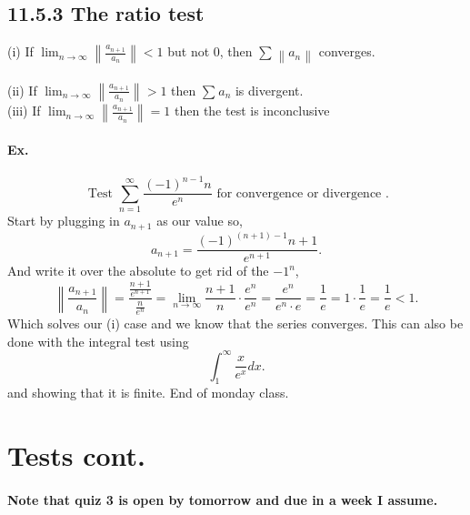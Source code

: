 \subsection*{11.5.3 The ratio test}%
\label{sub:11.5.3 The ratio test}
(i) If $ \lim_{ n \to \infty} \left\| \frac{ a_{ n+1 } }{ a_n } \right\|<1 $ but not 0, then $ \sum_{  } ^{  } \left\| a_n \right\| $ converges. \\ \\
(ii) If $ \lim_{ n \to \infty} \left\| \frac{ a_{ n+1 } }{ a_n } \right\| >1 $ then $ \sum_{  } ^{  } a_n $ is divergent. \\
(iii) If $ \lim_{ n \to \infty} \left\| \frac{ a_{ n+1 } }{ a_n } \right\|=1 $ then the test is inconclusive
\paragraph{Ex.}
\[
\text{ Test }\sum_{ n=1 } ^{ \infty } \frac{ \left( -1 \right) ^{ n-1 }n }{ e^{ n } } \text{ for convergence or divergence }
.\]
Start by plugging in $ a_{ n+1 } $ as our value so,
\[
a_{ n+1 }= \frac{ \left( -1 \right) ^{ \left( n+1 \right) -1 } n+1}{ e^{ n+1 } } 
.\] 
And write it over the absolute to get rid of the $ -1^{ n } $,
\[
\left\| \frac{ a_{ n+1 } }{ a_n } \right\| = \frac{ \frac{ n+1 }{ e^{ n+1 } } }{ \frac{ n }{ e^{ n } }  } = \lim_{ n \to \infty} \frac{ n+1 }{ n }\cdot \frac{ e^{ n } }{ e^{ n } } = \frac{ e^{ n } }{ e^{ n }\cdot e } = \frac{ 1 }{ e } = 1\cdot \frac{ 1 }{ e } = \frac{ 1 }{ e } <1
.\] 
Which solves our (i) case and we know that the series converges. This can also be done with the integral test using
\[
\int_{ 1 }^{ \infty } \frac{ x }{ e^{ x } } dx
.\] 
and showing that it is finite. End of monday class.

\section*{Tests cont.}%
\label{sec:Tests}
\paragraph{Note that quiz 3 is open by tomorrow and due in a week I assume.}

